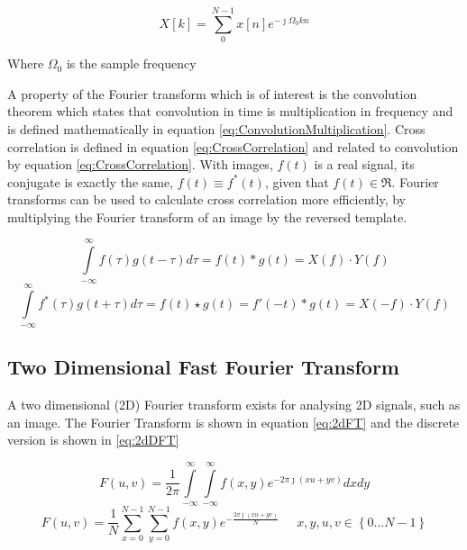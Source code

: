 \begin{equation}\label{eq:DFT}
X[k] = \sum\limits_{0}^{N-1}x[n]e^{-\jmath \Omega_0 kn}
\end{equation}
\begin{center}
Where $\Omega_0$ is the sample frequency
\end{center}

A property of the Fourier transform which is of interest is the convolution theorem which states that convolution in time is multiplication in frequency and is defined mathematically in equation \eqref{eq:ConvolutionMultiplication}. Cross correlation is defined in equation \eqref{eq:CrossCorrelation} and related to convolution by equation \eqref{eq:CrossCorrelation}. With images, $f(t)$ is a real signal, its conjugate is exactly the same, $f(t) \equiv f^*(t)$, given that $f(t) \in \Re$. Fourier transforms can be used to calculate cross correlation more efficiently, by multiplying the Fourier transform of an image by the reversed template.%


\begin{equation}\label{eq:ConvolutionMultiplication}
\int\limits_{-\infty}^{\infty}f(\tau)g(t-\tau)d\tau = f(t) \ast g(t) = X(f)\cdot Y(f)
\end{equation}
\begin{equation}\label{eq:CrossCorrelation}
\int\limits_{-\infty}^{\infty}f^*(\tau)g(t+\tau)d\tau = f(t) \star g(t) = f'(-t) \ast g(t) = X(-f)\cdot Y(f)
\end{equation}


\subsection{Two Dimensional Fast Fourier Transform}
A two dimensional (2D) Fourier transform exists for analysing 2D signals, such as an image. The Fourier Transform is shown in equation \eqref{eq:2dFT} and the discrete version is shown in \eqref{eq:2dDFT}

\begin{equation}\label{eq:2dFT}
F(u,v) = \frac{1}{2\pi}\int\limits_{-\infty}^{\infty}\int\limits_{-\infty}^{\infty}f(x,y)e^{-2\pi\jmath (xu+yv)}dxdy
\end{equation}
\begin{equation}\label{eq:2dDFT}
F(u,v) = \frac{1}{N} \sum\limits_{x=0}^{N-1}\sum\limits_{y=0}^{N-1}f(x,y)e^{-\frac{2\pi\jmath (xu+yv)}{N}} \; \; \; \; \; x,y,u,v \in \left\lbrace 0\dots N-1\right\rbrace
\end{equation}

